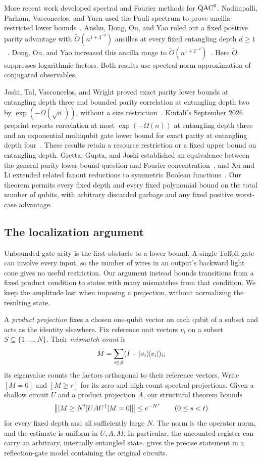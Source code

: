 More recent work developed spectral and Fourier methods for $\mathrm{QAC}^0$.
Nadimpalli, Parham, Vasconcelos, and Yuen used the Pauli spectrum to prove
ancilla-restricted lower bounds~\cite{NPVY2024}. Anshu, Dong, Ou, and Yao
ruled out a fixed positive parity advantage with
$\widetilde O(n^{1+3^{-d}})$ ancillas at every fixed entangling depth
$d\ge1$~\cite[Corollary 4.4 and Theorem 4.6]{ADOY2025}.
Dong, Ou, and Yao increased this ancilla range to
$\widetilde O(n^{1+2^{-d}})$~\cite[Corollary 3.3]{DOY2025LinearSize}.
Here $\widetilde O$ suppresses logarithmic factors. Both results use
spectral-norm approximation of conjugated observables.

Joshi, Tal, Vasconcelos, and Wright proved exact parity lower bounds at
entangling depth three and bounded parity correlation at entangling
depth two by $\exp(-\Omega(\sqrt n))$, without a size
restriction~\cite[Theorem 1.2 and Corollary 5.9]{JTVW2026}. Kintali's September 2026 preprint reports
correlation at most $\exp(-\Omega(n))$ at entangling depth three
and an exponential multiqubit gate lower bound for exact parity at
entangling depth four~\cite[Theorems 1--2]{Kintali2026ShallowParity}.
These results retain a resource restriction or a fixed upper bound on
entangling depth. Gretta, Gupta, and Joshi established an
equivalence between the general parity lower-bound question and Fourier
concentration~\cite{GGJ2026}, and Xu and Li extended related fanout
reductions to symmetric Boolean functions~\cite{XuLi2026Fanout}. Our theorem permits every fixed depth and
every fixed polynomial bound on the total number of qubits, with
arbitrary discarded garbage and any fixed positive worst-case advantage.

\subsection{The localization argument}

Unbounded gate arity is the first obstacle to a lower bound. A single
Toffoli gate can involve every input, so the number of wires in an
output's backward light cone gives no useful restriction. Our argument
instead bounds transitions from a fixed product condition to states
with many mismatches from that condition. We keep the amplitude lost
when imposing a projection, without normalizing the resulting state.

A \emph{product projection} fixes a chosen one-qubit vector on each qubit
of a subset and acts as the identity elsewhere. Fix reference unit
vectors $v_i$ on a subset $S\subseteq\{1,\ldots,N\}$. Their
\emph{mismatch count} is
\[
 M=\sum_{i\in S}(I-\lvert v_i\rangle\!\langle v_i\rvert)_i;
\]
its eigenvalue counts the factors orthogonal to their reference vectors.
Write $[M=0]$ and $[M\ge r]$ for its zero and high-count spectral
projections. Given a shallow circuit $U$ and a product projection $A$,
our structural theorem bounds
\[
 \left\lVert [M\ge N^t]UAU^\dagger[M=0]\right\rVert\le e^{-N^s}
 \qquad(0\le s<t)
\]
for every fixed depth and all sufficiently large $N$. The norm is the
operator norm, and the estimate is uniform in $U,A,M$. In particular,
the uncounted register can carry an arbitrary, internally entangled state.
 gives the precise statement in a reflection-gate
model containing the original circuits.

